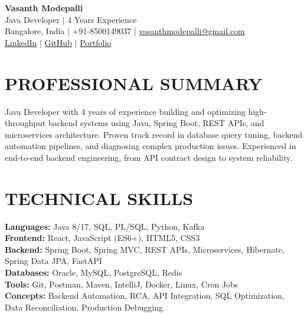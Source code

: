 \documentclass[a4paper,10pt]{article}
\begin{document}
\begin{center}
    {\Huge \textbf{Vasanth Modepalli}} \\ \vspace{2pt}
    Java Developer $|$ 4 Years Experience \\ \vspace{1pt}
    Bangalore, India $|$ +91-8500149037 $|$ \href{mailto:vasanthmodepalli@gmail.com}{vasanthmodepalli@gmail.com} \\ \vspace{2pt}
    \href{https://linkedin.com/in/}{LinkedIn} $|$ \href{https://github.com/}{GitHub} $|$ \href{https://portfolio.com/}{Portfolio}
\end{center}

\section*{PROFESSIONAL SUMMARY}
Java Developer with 4 years of experience building and optimizing high-throughput backend systems using Java, Spring Boot, REST APIs, and microservices architecture. Proven track record in database query tuning, backend automation pipelines, and diagnosing complex production issues. Experienced in end-to-end backend engineering, from API contract design to system reliability.

\section*{TECHNICAL SKILLS}
\textbf{Languages:} Java 8/17, SQL, PL/SQL, Python, Kafka \\
\textbf{Frontend:} React, JavaScript (ES6+), HTML5, CSS3 \\
\textbf{Backend:} Spring Boot, Spring MVC, REST APIs, Microservices, Hibernate, Spring Data JPA, FastAPI \\
\textbf{Databases:} Oracle, MySQL, PostgreSQL, Redis \\
\textbf{Tools:} Git, Postman, Maven, IntelliJ, Docker, Linux, Cron Jobs \\
\textbf{Concepts:} Backend Automation, RCA, API Integration, SQL Optimization, Data Reconciliation, Production Debugging
\end{document}
